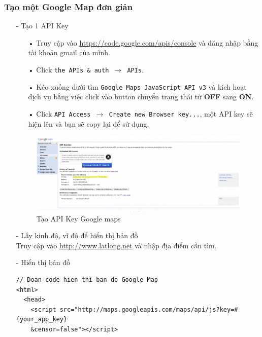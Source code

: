 \documentclass[a4paper]{article}
\begin{document}
\subsubsection{Tạo một Google Map đơn giản}
\begin{itemize}    
    \item[-] Tạo 1 API Key
    \begin{itemize}
        \item[•] Truy cập vào \url{https://code.google.com/apis/console} và đăng nhập bằng tài khoản gmail của mình.
        \item[•] Click \texttt{the APIs \& auth $\rightarrow$ APIs}.
        \item[•] Kéo xuống dưới tìm \texttt{Google Maps JavaScript API v3} và kích hoạt dịch vụ bằng việc click vào button chuyển trạng thái từ \textbf{OFF} sang \textbf{ON}.
        \item[•] Click \texttt{API Access $\rightarrow$ Create new Browser key...}, một API key sẽ hiện lên và bạn sẽ copy lại để sử dụng.
    \end{itemize}
    \begin{figure}[h]
        \includegraphics[scale=0.6]{gmap_api}
        \centering
        \caption{Tạo API Key Google maps}
        \label{fig:gmap_api}
    \end{figure}
    \item[-] Lấy kinh độ, vĩ độ để hiển thị bản đồ\\
     Truy cập vào \url{http://www.latlong.net} và nhập địa điểm cần tìm.
    \item[-] Hiển thị bản đồ
\begin{lstlisting}
// Doan code hien thi ban do Google Map
<html>
  <head>
    <script src="http://maps.googleapis.com/maps/api/js?key=#{your_app_key}
    &censor=false"></script>

\end{lstlisting}
\end{itemize}
\end{document}
